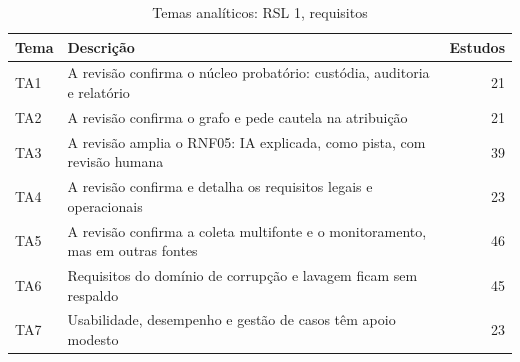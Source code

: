 \begin{table}[htbp]
\centering
\caption{Temas analíticos: RSL 1, requisitos}
\label{tab:temas-A4}
\small
\begin{tabular}{lp{11cm}r}
\hline
\textbf{Tema} & \textbf{Descrição} & \textbf{Estudos} \\
\hline
TA1 & A revisão confirma o núcleo probatório: custódia, auditoria e relatório & 21 \\
TA2 & A revisão confirma o grafo e pede cautela na atribuição & 21 \\
TA3 & A revisão amplia o RNF05: IA explicada, como pista, com revisão humana & 39 \\
TA4 & A revisão confirma e detalha os requisitos legais e operacionais & 23 \\
TA5 & A revisão confirma a coleta multifonte e o monitoramento, mas em outras fontes & 46 \\
TA6 & Requisitos do domínio de corrupção e lavagem ficam sem respaldo & 45 \\
TA7 & Usabilidade, desempenho e gestão de casos têm apoio modesto & 23 \\
\hline
\end{tabular}
\end{table}
